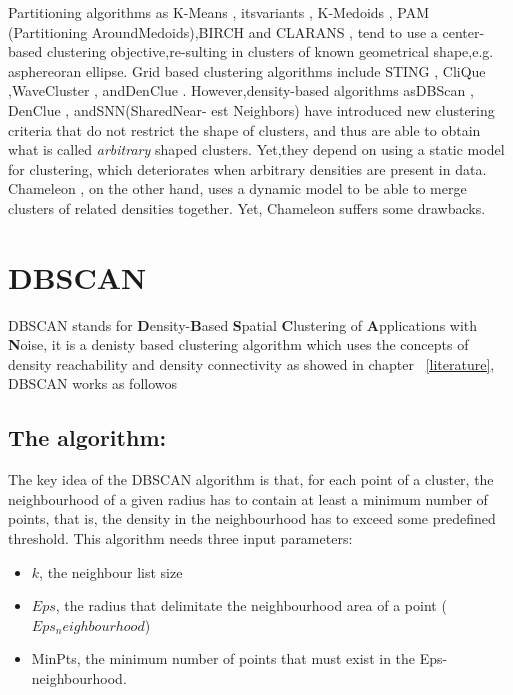 Partitioning algorithms as K-Means \citep{clustering_1}, itsvariants \citep{clustering_2} \citep{clustering_3}, K-Medoids \citep{clustering_4}, PAM \citep{clustering_5} (Partitioning AroundMedoids),BIRCH \citep{clustering_6} and
CLARANS \citep{clustering_7}, tend to use a center-based clustering objective,re-sulting in clusters of known geometrical shape,e.g. asphereoran ellipse. Grid based clustering algorithms include STING \citep{clustering_8}, CliQue \citep{clustering_9},WaveCluster \citep{clustering_10}, andDenClue \citep{clustering_11}.
However,density-based
algorithms asDBScan \citep{clustering_12}, DenClue \citep{clustering_11}, andSNN(SharedNear-
est Neighbors) \citep{clustering_13} have introduced new clustering criteria that do not restrict the shape of clusters, and thus are able to obtain what is called \textit{arbitrary} shaped clusters.
Yet,they depend on using a static model for clustering, which deteriorates when arbitrary densities are present in data. Chameleon  \citep{clustering_14}, on the
other hand, uses a dynamic model to be able to merge clusters of related densities together. Yet, Chameleon suffers some drawbacks.

\section{DBSCAN}
DBSCAN stands for \textbf{D}ensity-\textbf{B}ased \textbf{S}patial \textbf{C}lustering of \textbf{A}pplications with \textbf{N}oise, it is a denisty based clustering algorithm which uses the concepts of density reachability and density connectivity\citep{literature_1} as showed in chapter ~\ref{literature}, DBSCAN works as followos
\subsection{The algorithm:}
\citep{literature_2}  The key idea of the DBSCAN algorithm is that, for each point of a cluster, the neighbourhood 
of a given radius has to contain at least a minimum number of points, that is, the density in 
the neighbourhood has to exceed some predefined threshold. This algorithm needs three 
input parameters:
\begin{itemize}  
\item{$k$, the neighbour list size} 
\item{$Eps$, the radius that delimitate the neighbourhood area of a point ($Eps_neighbourhood$)}
\item{MinPts, the minimum number of points that must exist in the Eps-neighbourhood.}
\end{itemize} 

